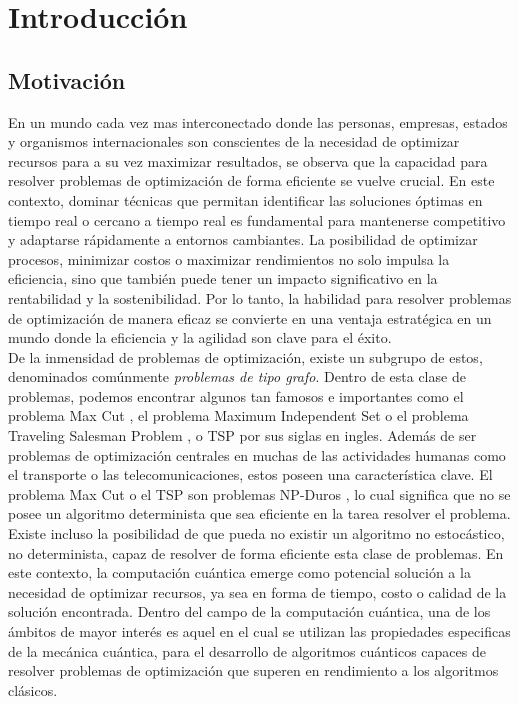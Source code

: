 \chapter{Introducción}

\section{Motivación}

En un mundo cada vez mas interconectado donde las personas, empresas, estados y organismos internacionales son conscientes de la necesidad de optimizar recursos para a su vez maximizar resultados, se observa que la capacidad para resolver problemas de optimización de forma eficiente se vuelve crucial. En este contexto, dominar técnicas que permitan identificar las soluciones óptimas en tiempo real o cercano a tiempo real es fundamental para mantenerse competitivo y adaptarse rápidamente a entornos cambiantes. La posibilidad de optimizar procesos, minimizar costos o maximizar rendimientos no solo impulsa la eficiencia, sino que también puede tener un impacto significativo en la rentabilidad y la sostenibilidad. Por lo tanto, la habilidad para resolver problemas de optimización de manera eficaz se convierte en una ventaja estratégica en un mundo donde la eficiencia y la agilidad son clave para el éxito. \\ 

De la inmensidad de problemas de optimización, existe un subgrupo de estos, denominados comúnmente \textit{problemas de tipo grafo}. Dentro de esta clase de problemas, podemos encontrar algunos tan famosos e importantes como el problema Max Cut \citep{yang}, el problema Maximum Independent Set \citep{heal} o el problema Traveling Salesman Problem \citep{bermejo}, o TSP por sus siglas en ingles. Además de ser problemas de optimización centrales en muchas de las actividades humanas como el transporte o las telecomunicaciones, estos poseen una característica clave. El problema Max Cut o el TSP son problemas NP-Duros \citep{hoerl}, lo cual significa que no se posee un algoritmo determinista que sea eficiente en la tarea resolver el problema. Existe incluso la posibilidad de que pueda no existir un algoritmo no estocástico, no determinista, capaz de resolver de forma eficiente esta clase de problemas. En este contexto, la computación cuántica emerge como potencial solución a la necesidad de optimizar recursos, ya sea en forma de tiempo, costo o calidad de la solución encontrada. Dentro del campo de la computación cuántica, una de los ámbitos de mayor interés es aquel en el cual se utilizan las propiedades especificas de la mecánica cuántica, para el desarrollo de algoritmos cuánticos capaces de resolver problemas de optimización que superen en rendimiento a los algoritmos clásicos.

